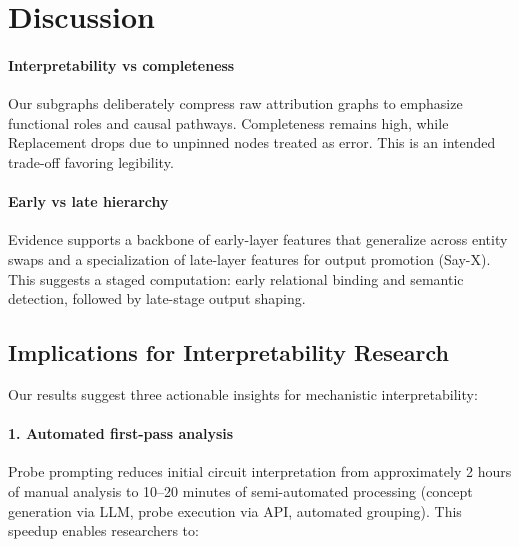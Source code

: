 
\section{Discussion}
\label{sec:discussion}

\paragraph{Interpretability vs completeness}
Our subgraphs deliberately compress raw attribution graphs to emphasize functional roles and causal pathways. Completeness remains high, while Replacement drops due to unpinned nodes treated as error. This is an intended trade-off favoring legibility.

\paragraph{Early vs late hierarchy}
Evidence supports a backbone of early-layer features that generalize across entity swaps and a specialization of late-layer features for output promotion (Say-X). This suggests a staged computation: early relational binding and semantic detection, followed by late-stage output shaping.

\subsection{Implications for Interpretability Research}

Our results suggest three actionable insights for mechanistic interpretability:

\paragraph{1. Automated first-pass analysis}
Probe prompting reduces initial circuit interpretation from approximately 2 hours of manual analysis to 10--20 minutes of semi-automated processing (concept generation via LLM, probe execution via API, automated grouping). This speedup enables researchers to:

